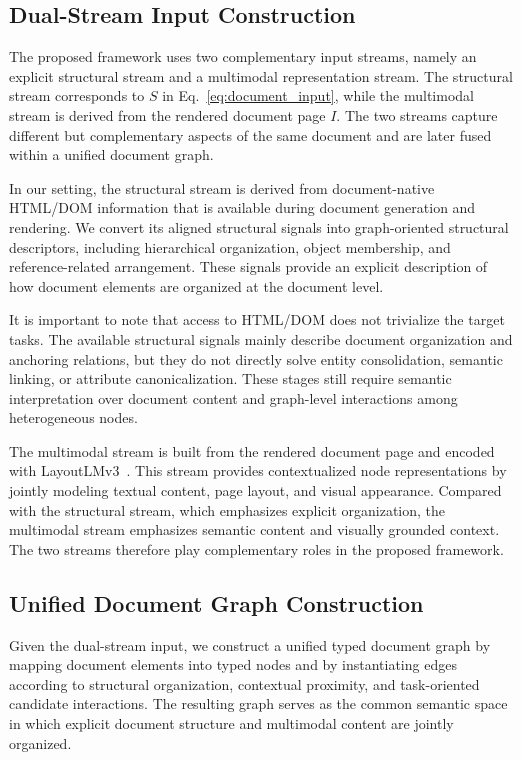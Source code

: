 \documentclass[pdflatex,twocolumn,iicol,sn-vancouver-num]{sn-jnl}%
\theoremstyle{thmstyleone}%
\theoremstyle{thmstyletwo}%
\theoremstyle{thmstylethree}%
\begin{document}
\subsection{Dual-Stream Input Construction}

The proposed framework uses two complementary input streams, namely an explicit structural stream and a multimodal representation stream. The structural stream corresponds to \(S\) in Eq.~\eqref{eq:document_input}, while the multimodal stream is derived from the rendered document page \(I\). The two streams capture different but complementary aspects of the same document and are later fused within a unified document graph.

In our setting, the structural stream is derived from document-native HTML/DOM information that is available during document generation and rendering. We convert its aligned structural signals into graph-oriented structural descriptors, including hierarchical organization, object membership, and reference-related arrangement. These signals provide an explicit description of how document elements are organized at the document level.

It is important to note that access to HTML/DOM does not trivialize the target tasks. The available structural signals mainly describe document organization and anchoring relations, but they do not directly solve entity consolidation, semantic linking, or attribute canonicalization. These stages still require semantic interpretation over document content and graph-level interactions among heterogeneous nodes.

The multimodal stream is built from the rendered document page and encoded with LayoutLMv3~\cite{huangLayoutLMv3PretrainingDocument2022}. This stream provides contextualized node representations by jointly modeling textual content, page layout, and visual appearance. Compared with the structural stream, which emphasizes explicit organization, the multimodal stream emphasizes semantic content and visually grounded context. The two streams therefore play complementary roles in the proposed framework.



\subsection{Unified Document Graph Construction}

Given the dual-stream input, we construct a unified typed document graph by mapping document elements into typed nodes and by instantiating edges according to structural organization, contextual proximity, and task-oriented candidate interactions. The resulting graph serves as the common semantic space in which explicit document structure and multimodal content are jointly organized.
\end{document}
